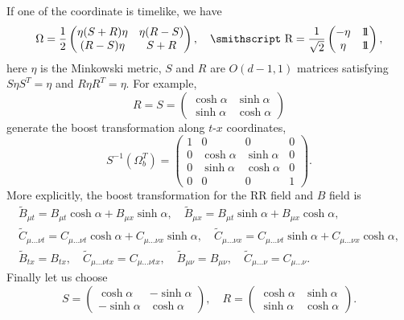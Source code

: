 \documentclass[a4paper,12pt]{article}
\newcommand{\mathst}[1]{\mbox{\smithscript #1}}
\begin{document}
If one of the coordinate is timelike, we have
\begin{equation}
\label{gentec2} 
\Omega={1\over 2}\begin{pmatrix}
\eta(S+R)\eta & \eta(R-S)\\
(R-S)\eta & S+R
\end{pmatrix},\quad
{\mathst R}={1\over \sqrt{2}}\begin{pmatrix}
-\eta& 1\!\!1\\
\eta & 1\!\!1
\end{pmatrix},
\end{equation}
here $\eta$ is the Minkowski metric, 
$S$ and $R$ are $O(d-1,1)$ matrices satisfying
$S\eta S^T=\eta$ and
$R\eta R^T=\eta$.
For example, 
$$ R=S=\begin{pmatrix}
\cosh\alpha & \sinh \alpha\\
\sinh\alpha & \cosh\alpha
\end{pmatrix}$$
generate the boost transformation along $t$-$x$ 
coordinates,
\begin{equation}
\label{soluexbb}
S^{-1}(\Omega^T_b)=\begin{pmatrix}
1 & 0 & 0 & 0\\
0 & \cosh\alpha & \sinh\alpha & 0\\
0 & \sinh\alpha &\cosh\alpha & 0 \\
0 & 0 & 0 & 1
\end{pmatrix}.
\end{equation}
More explicitly, the boost transformation for the RR
field and $B$ field is
\begin{subequations}
\begin{gather}
\label{soluexb5}
{\tilde B}_{\mu t}=B_{\mu t}\cosh\alpha
+B_{\mu x}\sinh\alpha,\quad 
{\tilde B}_{\mu x}=B_{\mu t}\sinh\alpha
+B_{\mu x}\cosh\alpha,\\
\label{soluexb6}
{\tilde C}_{\mu\dots\nu t}=C_{\mu\dots\nu t}\cosh\alpha
+C_{\mu\dots\nu x}\sinh\alpha,\quad 
{\tilde C}_{\mu\dots\nu x}=C_{\mu\dots\nu t}\sinh\alpha
+C_{\mu\dots\nu x}\cosh\alpha,\\
\label{soluexb7}
{\tilde B}_{tx}=B_{tx},\quad
{\tilde C}_{\mu\dots\nu tx}=C_{\mu\dots\nu tx},\quad
{\tilde B}_{\mu\nu}=B_{\mu\nu},\quad
{\tilde C}_{\mu\dots\nu}=C_{\mu\dots\nu}.
\end{gather}
\end{subequations}
Finally let us choose\cite{sen91}
\begin{equation}
\label{soluex4}
S=\begin{pmatrix}
\cosh \alpha & -\sinh\alpha\\
-\sinh\alpha & \cosh\alpha
\end{pmatrix},
\quad R=\begin{pmatrix}
\cosh \alpha & \sinh\alpha\\
\sinh\alpha & \cosh\alpha
\end{pmatrix}.
\end{equation}
\end{document}
